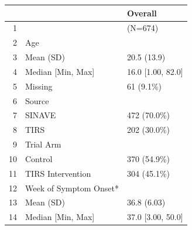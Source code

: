 \begin{table}[ht]
\centering
\begin{tabular}{rll}
  \hline
 &   & Overall \\ 
  \hline
1 &  & (N=674) \\ 
  2 & Age &  \\ 
  3 &   Mean (SD) & 20.5 (13.9) \\ 
  4 &   Median [Min, Max] & 16.0 [1.00, 82.0] \\ 
  5 &   Missing & 61 (9.1\%) \\ 
  6 & Source &  \\ 
  7 &   SINAVE & 472 (70.0\%) \\ 
  8 &   TIRS & 202 (30.0\%) \\ 
  9 & Trial Arm &  \\ 
  10 &   Control & 370 (54.9\%) \\ 
  11 &   TIRS Intervention & 304 (45.1\%) \\ 
  12 & Week of Symptom Onset* &  \\ 
  13 &   Mean (SD) & 36.8 (6.03) \\ 
  14 &   Median [Min, Max] & 37.0 [3.00, 50.0] \\ 
   \hline
\end{tabular}
\end{table}
